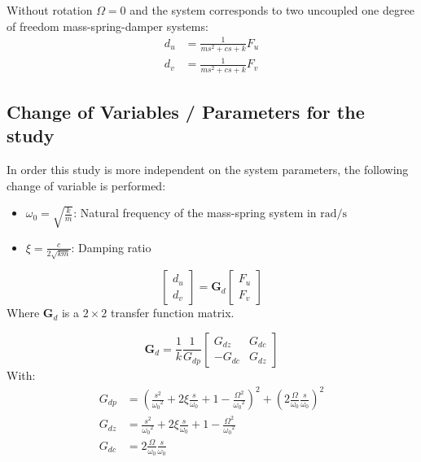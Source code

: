 \documentclass{ISMA_USD2020}
\begin{document}
Without rotation \(\Omega = 0\) and the system corresponds to two uncoupled one degree of freedom mass-spring-damper systems:
\begin{subequations}
\label{eq:oem_no_rotation}
  \begin{align}
    d_u &= \frac{1}{m s^2 + cs + k} F_u \\
    d_v &= \frac{1}{m s^2 + cs + k} F_v
  \end{align}
\end{subequations}

\subsection{Change of Variables / Parameters for the study}
\label{sec:org3cdb1ab}

In order this study is more independent on the system parameters, the following change of variable is performed:
\begin{itemize}
\item \(\omega_0 = \sqrt{\frac{k}{m}}\): Natural frequency of the mass-spring system in \(\si{\radian/\s}\)
\item \(\xi = \frac{c}{2 \sqrt{k m}}\): Damping ratio
\end{itemize}

\begin{equation}
\label{eq:tf_d}
  \begin{bmatrix} d_u \\ d_v \end{bmatrix} = \bm{G}_d \begin{bmatrix} F_u \\ F_v \end{bmatrix}
\end{equation}
Where \(\bm{G}_d\) is a \(2 \times 2\) transfer function matrix.

\begin{equation}
\bm{G}_d = \frac{1}{k} \frac{1}{G_{dp}}
\begin{bmatrix}
   G_{dz} & G_{dc} \\
  -G_{dc} & G_{dz}
\end{bmatrix}
\end{equation}
With:
\begin{subequations}
  \begin{align}
    G_{dp} &= \left( \frac{s^2}{{\omega_0}^2} + 2 \xi \frac{s}{\omega_0} + 1 - \frac{{\Omega}^2}{{\omega_0}^2} \right)^2 + \left( 2 \frac{\Omega}{\omega_0} \frac{s}{\omega_0} \right)^2 \\
    G_{dz} &= \frac{s^2}{{\omega_0}^2} + 2 \xi \frac{s}{\omega_0} + 1 - \frac{{\Omega}^2}{{\omega_0}^2} \\
    G_{dc} &= 2 \frac{\Omega}{\omega_0} \frac{s}{\omega_0}
  \end{align}
\end{subequations}
\end{document}
